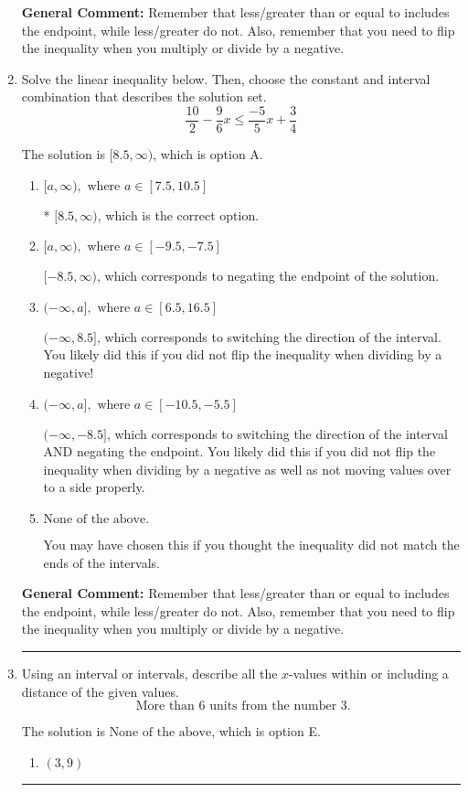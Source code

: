 \documentclass{extbook}[14pt]
\newcommand{\litem}[1]{\item #1

\rule{\textwidth}{0.4pt}}
\begin{document}
\begin{enumerate}
{\textbf{General Comment:} Remember that less/greater than or equal to includes the endpoint, while less/greater do not. Also, remember that you need to flip the inequality when you multiply or divide by a negative.
}
\litem{
Solve the linear inequality below. Then, choose the constant and interval combination that describes the solution set.
\[ \frac{10}{2} - \frac{9}{6} x \leq \frac{-5}{5} x + \frac{3}{4} \]

The solution is \( [8.5, \infty) \), which is option A.\begin{enumerate}[label=\Alph*.]
\item \( [a, \infty), \text{ where } a \in [7.5, 10.5] \)

* $[8.5, \infty)$, which is the correct option.
\item \( [a, \infty), \text{ where } a \in [-9.5, -7.5] \)

 $[-8.5, \infty)$, which corresponds to negating the endpoint of the solution.
\item \( (-\infty, a], \text{ where } a \in [6.5, 16.5] \)

 $(-\infty, 8.5]$, which corresponds to switching the direction of the interval. You likely did this if you did not flip the inequality when dividing by a negative!
\item \( (-\infty, a], \text{ where } a \in [-10.5, -5.5] \)

 $(-\infty, -8.5]$, which corresponds to switching the direction of the interval AND negating the endpoint. You likely did this if you did not flip the inequality when dividing by a negative as well as not moving values over to a side properly.
\item \( \text{None of the above}. \)

You may have chosen this if you thought the inequality did not match the ends of the intervals.
\end{enumerate}

\textbf{General Comment:} Remember that less/greater than or equal to includes the endpoint, while less/greater do not. Also, remember that you need to flip the inequality when you multiply or divide by a negative.
}
\litem{
Using an interval or intervals, describe all the $x$-values within or including a distance of the given values.
\[ \text{ More than } 6 \text{ units from the number } 3. \]

The solution is \( \text{None of the above} \), which is option E.\begin{enumerate}[label=\Alph*.]
\item \( (3, 9) \)


\end{enumerate}}
\end{enumerate}
\end{document}
